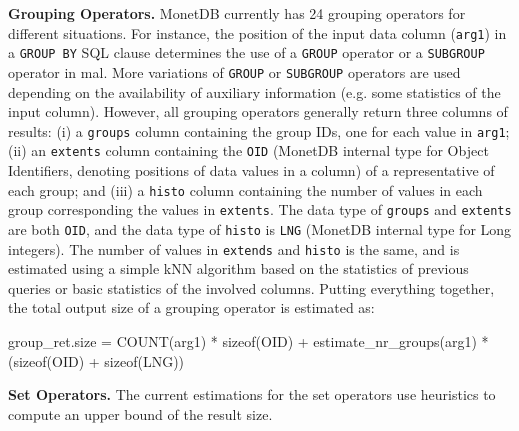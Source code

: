 \documentclass[conference]{IEEEtran}
\def\Skip{\par\medskip\nobreak\noindent}
\begin{document}
\Skip\textbf{Grouping Operators.}
MonetDB currently has 24 grouping operators for different situations.
For instance, the position of the input data column (\texttt{\small arg1}) in a \texttt{\small GROUP BY} SQL clause determines the use of a \texttt{\small GROUP} operator or a \texttt{\small SUBGROUP} operator in {\sc mal}.
More variations of \texttt{\small GROUP} or \texttt{\small SUBGROUP} operators are used depending on the availability of auxiliary information (e.g. some statistics of the input column).
However, all grouping operators generally return three columns of results: (i) a \texttt{\small groups} column containing the group IDs, one for each value in \texttt{\small arg1}; (ii) an \texttt{\small extents} column containing the \texttt{\small OID} (MonetDB internal type for Object Identifiers, denoting positions of data values in a column) of a representative of each group; and (iii) a \texttt{\small histo} column containing the number of values in each group corresponding the values in \texttt{\small extents}.
The data type of \texttt{\small groups} and \texttt{\small extents} are both \texttt{\small OID}, and the data type of \texttt{\small histo} is \texttt{\small LNG} (MonetDB internal type for Long integers).
The number of values in \texttt{\small extends} and \texttt{\small histo} is the same, and is estimated using a simple kNN algorithm based on the statistics of previous queries or basic statistics of the involved columns.
Putting everything together, the total output size of a grouping operator is estimated as:
\begin{verb}
group_ret.size = COUNT(arg1) * sizeof(OID) +
  estimate_nr_groups(arg1) * (sizeof(OID) + sizeof(LNG))
\end{verb}

\Skip\textbf{Set Operators.}
%
%
The current estimations for the set operators use heuristics to compute an upper bound of the result size.
\end{document}
